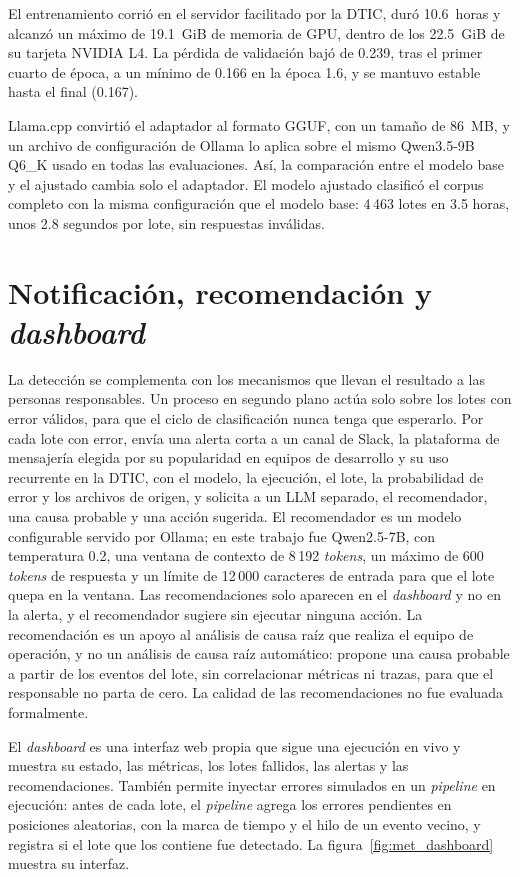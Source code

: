 El entrenamiento corrió en el servidor facilitado por la DTIC, duró 10.6~horas y alcanzó un máximo de 19.1~GiB de memoria de GPU, dentro de los 22.5~GiB de su tarjeta NVIDIA L4. La pérdida de validación bajó de 0.239, tras el primer cuarto de época, a un mínimo de 0.166 en la época 1.6, y se mantuvo estable hasta el final (0.167).


Llama.cpp convirtió el adaptador al formato GGUF, con un tamaño de 86~MB, y un archivo de configuración de Ollama lo aplica sobre el mismo Qwen3.5-9B Q6\_K usado en todas las evaluaciones. Así, la comparación entre el modelo base y el ajustado cambia solo el adaptador. El modelo ajustado clasificó el corpus completo con la misma configuración que el modelo base: 4\,463 lotes en 3.5 horas, unos 2.8 segundos por lote, sin respuestas inválidas.

\section{Notificación, recomendación y \textit{dashboard}}\label{sec:met_notificacion}\label{sec:met_dashboard}

La detección se complementa con los mecanismos que llevan el resultado a las personas responsables. Un proceso en segundo plano actúa solo sobre los lotes con error válidos, para que el ciclo de clasificación nunca tenga que esperarlo. Por cada lote con error, envía una alerta corta a un canal de Slack, la plataforma de mensajería elegida por su popularidad en equipos de desarrollo y su uso recurrente en la DTIC, con el modelo, la ejecución, el lote, la probabilidad de error y los archivos de origen, y solicita a un LLM separado, el recomendador, una causa probable y una acción sugerida. El recomendador es un modelo configurable servido por Ollama; en este trabajo fue Qwen2.5-7B, con temperatura 0.2, una ventana de contexto de 8\,192 \textit{tokens}, un máximo de 600 \textit{tokens} de respuesta y un límite de 12\,000 caracteres de entrada para que el lote quepa en la ventana. Las recomendaciones solo aparecen en el \textit{dashboard} y no en la alerta, y el recomendador sugiere sin ejecutar ninguna acción. La recomendación es un apoyo al análisis de causa raíz que realiza el equipo de operación, y no un análisis de causa raíz automático: propone una causa probable a partir de los eventos del lote, sin correlacionar métricas ni trazas, para que el responsable no parta de cero. La calidad de las recomendaciones no fue evaluada formalmente.

El \textit{dashboard} es una interfaz web propia que sigue una ejecución en vivo y muestra su estado, las métricas, los lotes fallidos, las alertas y las recomendaciones. También permite inyectar errores simulados en un \textit{pipeline} en ejecución: antes de cada lote, el \textit{pipeline} agrega los errores pendientes en posiciones aleatorias, con la marca de tiempo y el hilo de un evento vecino, y registra si el lote que los contiene fue detectado. La figura~\ref{fig:met_dashboard} muestra su interfaz.

